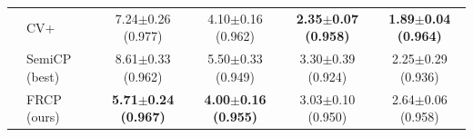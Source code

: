 \begin{table}[t]
\begin{tabular}{llcccc}
 & CV+ & 7.24$\pm$0.26 {\scriptsize(0.977)} & 4.10$\pm$0.16 {\scriptsize(0.962)} & \textbf{2.35$\pm$0.07 {\scriptsize(0.958)}} & \textbf{1.89$\pm$0.04 {\scriptsize(0.964)}}\\
 & SemiCP (best) & 8.61$\pm$0.33 {\scriptsize(0.962)} & 5.50$\pm$0.33 {\scriptsize(0.949)} & 3.30$\pm$0.39 {\scriptsize(0.924)} & 2.25$\pm$0.29 {\scriptsize(0.936)}\\
 & FRCP (ours) & \textbf{5.71$\pm$0.24 {\scriptsize(0.967)}} & \textbf{4.00$\pm$0.16 {\scriptsize(0.955)}} & 3.03$\pm$0.10 {\scriptsize(0.950)} & 2.64$\pm$0.06 {\scriptsize(0.958)}\\
\bottomrule
\end{tabular}
\end{table}
